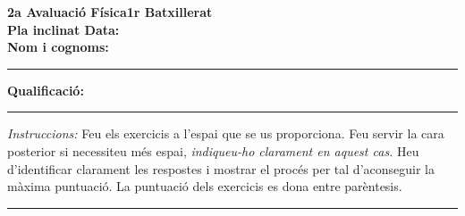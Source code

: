 \documentclass[a4paper,12pt]{article}
\begin{document}
\textbf{2a Avaluació \hfill{}Física\hfill{}1r Batxillerat}\\
\textbf{Pla inclinat  \hfill{}\hfill{}Data:$\qquad\qquad$}\\
\textbf{Nom i cognoms:}\rule{2.4in}{.01in}
\hfill{}\textbf{Qualificació:}\rule{1in}{.01in} \vspace{0.5cm}

\small
\hspace{.25in} \textit{Instruccions:\/{}} Feu els exercicis a
l'espai que se us proporciona. Feu servir la cara posterior si
necessiteu més espai, \textit{indiqueu-ho clarament en aquest
cas.\/{}} Heu d'identificar clarament les respostes i mostrar el
procés per tal d'aconseguir la màxima puntuació. La puntuació dels
exercicis es dona entre parèntesis.
\\
\rule[.2in]{7.5in}{.01in}
\normalsize
\end{document}
